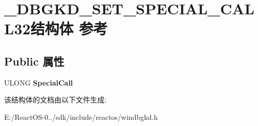 \hypertarget{struct___d_b_g_k_d___s_e_t___s_p_e_c_i_a_l___c_a_l_l32}{}\section{\+\_\+\+D\+B\+G\+K\+D\+\_\+\+S\+E\+T\+\_\+\+S\+P\+E\+C\+I\+A\+L\+\_\+\+C\+A\+L\+L32结构体 参考}
\label{struct___d_b_g_k_d___s_e_t___s_p_e_c_i_a_l___c_a_l_l32}
\subsection*{Public 属性}
\begin{DoxyCompactItemize}
\item 
\mbox{\label{struct___d_b_g_k_d___s_e_t___s_p_e_c_i_a_l___c_a_l_l32_ac03d583e2d79836ad7cc788bd793388f}} 
U\+L\+O\+NG {\bfseries Special\+Call}
\end{DoxyCompactItemize}


该结构体的文档由以下文件生成\+:\begin{DoxyCompactItemize}
\item 
E\+:/\+React\+O\+S-\/0../sdk/include/reactos/windbgkd.\+h\end{DoxyCompactItemize}
